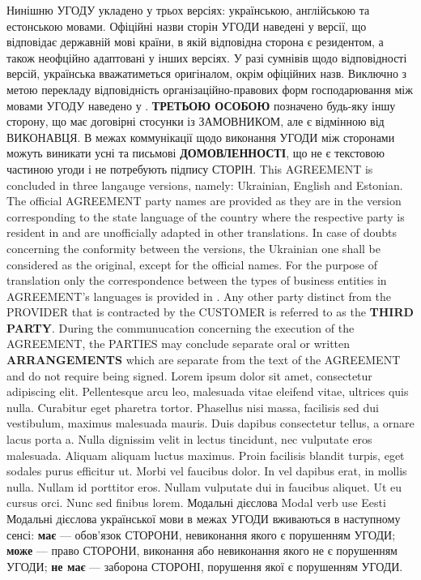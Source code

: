 \begin{Form}
\begin{paracol}{3}
        {Нинішню УГОДУ укладено у трьох версіях: українською, англійською та естонською мовами. Офіційні назви сторін УГОДИ наведені у версії, що відповідає державній мові країни, в якій відповідна сторона є резидентом, а також неофційно адаптовані у інших версіях. У разі сумнівів щодо відповідності версій, українська вважатиметься оригіналом, окрім офіційних назв. Виключно з метою перекладу відповідність ор\-га\-ні\-за\-цій\-но-правових форм господарювання між мовами УГОДУ наведено у . \textbf{ТРЕТЬОЮ ОСОБОЮ} позначено будь-яку іншу сторону, що має договірні стосунки із ЗАМОВНИКОМ, але є відмінною від ВИКОНАВЦЯ. В межах коммунікації щодо виконання УГОДИ між сторонами можуть виникати усні та письмові \textbf{ДОМОВЛЕННОСТІ}, що не є текстовою частиною угоди і не потребують підпису СТОРІН.
        }
        {This AGREEMENT is concluded in three langauge versions, na\-me\-ly: Ukrainian, English and Estonian. The official AGREEMENT party names are provided as they are in the version corresponding to the state language of the country where the respective party is resident in and are unofficially adapted in other translations. In case of doubts concerning the conformity between the versions, the Ukrainian one shall be considered as the original, except for the official names. For the purpose of translation only the correspondence between the types of business entities in AGREEMENT's languages is provided in . Any other party distinct from the PROVIDER that is contracted by the CUSTOMER is referred to as the \textbf{THIRD PARTY}. During the communucation concerning the execution of the AGREEMENT, the PARTIES may conclude separate oral or written \textbf{ARRANGEMENTS} which are separate from the text of the AGREEMENT and do not require being signed.
        }
        {Lorem ipsum dolor sit amet, consectetur adipiscing elit. Pellentesque arcu leo, malesuada vitae eleifend vitae, ultrices quis nulla. Curabitur eget pharetra tortor. Phasellus nisi massa, facilisis sed dui vestibulum, maximus malesuada mauris. Duis dapibus consectetur tellus, a ornare lacus porta a. Nulla dignissim velit in lectus tincidunt, nec vulputate eros malesuada. Aliquam aliquam luctus maximus. Proin facilisis blandit turpis, eget sodales purus efficitur ut. Morbi vel faucibus dolor. In vel dapibus erat, in mollis nulla. Nullam id porttitor eros. Nullam vulputate dui in faucibus aliquet. Ut eu cursus orci. Nunc sed finibus lorem.}
      \clause
        {Модальні дієслова}
        {Modal verb use}
        {Eesti}
        {Модальні дієслова української мови в межах УГОДИ вживаються в наступному сенсі: \textbf{має} — обов’язок СТОРОНИ, невиконання якого є порушенням УГОДИ; \textbf{може} — право СТОРОНИ, виконання або невиконання якого не є порушенням УГОДИ; \textbf{не має} — заборона СТОРОНІ, порушення якої є порушенням УГОДИ.}

\end{paracol}
\end{Form}
